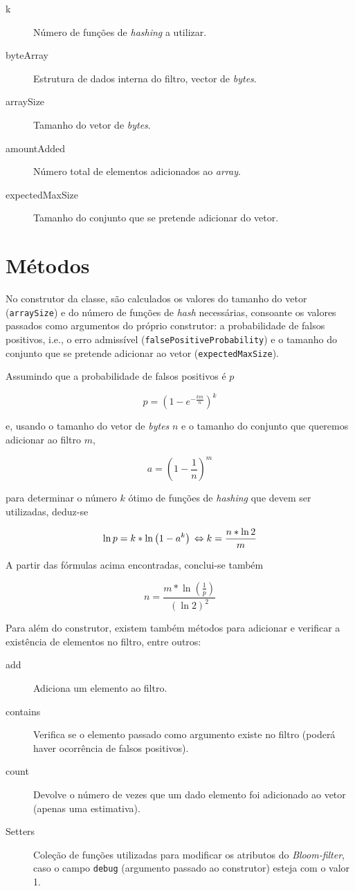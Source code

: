 \documentclass[a4paper,11pt,openright,oneside]{report}
\begin{document}
\begin{description}
\item[k]
Número de funções de \textit{hashing} a utilizar.
\item[byteArray]
Estrutura de dados interna do filtro, vector de \textit{bytes}.
\item[arraySize]
Tamanho do vetor de \textit{bytes}.
\item[amountAdded]
Número total de elementos adicionados ao \textit{array}.
\item[expectedMaxSize]
Tamanho do conjunto que se pretende adicionar do vetor.
\end{description}

\section{Métodos}
\label{sec.methods}

No construtor da classe, são calculados os valores do tamanho do vetor (\texttt{arraySize}) e do número de funções de \textit{hash} necessárias, consoante os valores passados como argumentos do próprio construtor: a probabilidade de falsos positivos, i.e., o erro admissível (\texttt{falsePositiveProbability}) e o tamanho do conjunto que se pretende adicionar ao vetor (\texttt{expectedMaxSize}). 

Assumindo que a probabilidade de falsos positivos é $p$

$$ p =  \left(1 - e^{-\frac{km}{n}}\right)^k $$

e, usando o tamanho do vetor de \textit{bytes} $n$ e o tamanho do conjunto que queremos adicionar ao filtro $m$,

$$ a = \left(1 - \frac{1}{n}\right)^m $$

para determinar o número $k$ ótimo de funções de \textit{hashing} que devem ser utilizadas, deduz-se

$$ \ln p = k * \ln \left(1 - a^k\right) \\
\Leftrightarrow k =  \frac{n * \ln 2}{m}$$

A partir das fórmulas acima encontradas, conclui-se também

$$ n = \frac{m * \ln \left(\frac{1}{p}\right)}{\left(\ln 2\right) ^ 2} $$

Para além do construtor, existem também métodos para adicionar e verificar a existência de elementos no filtro, entre outros:

\begin{description}
\item[add]
Adiciona um elemento ao filtro.
\item[contains]
Verifica se o elemento passado como argumento existe no filtro (poderá haver ocorrência de falsos positivos).
\item[count]
Devolve o número de vezes que um dado elemento foi adicionado ao vetor (apenas uma estimativa).
\item[Setters]
Coleção de funções utilizadas para modificar os atributos do \textit{Bloom-filter}, caso o campo \texttt{debug} (argumento passado ao construtor) esteja com o valor 1.
\end{description}
\end{document}
